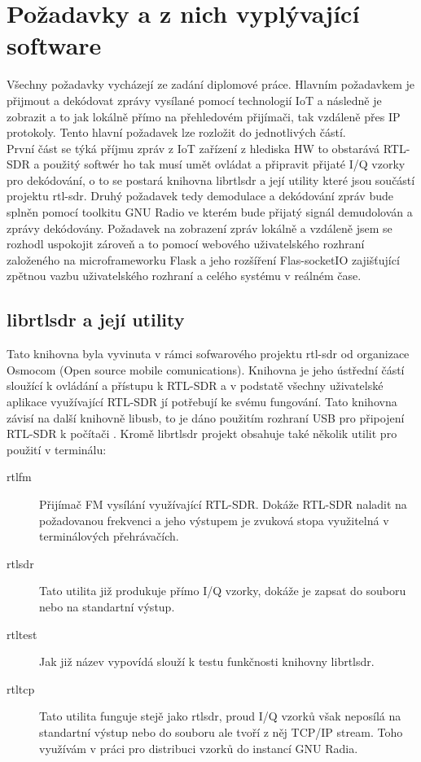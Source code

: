 \documentclass{ctuthesis}
\begin{document}
\section{Požadavky a z nich vyplývající software}
Všechny požadavky vycházejí ze zadání diplomové práce. Hlavním požadavkem je přijmout a dekódovat zprávy vysílané pomocí technologií IoT a následně je zobrazit a to jak lokálně přímo na přehledovém přijímači, tak vzdáleně přes IP protokoly. Tento hlavní požadavek lze rozložit do jednotlivých částí.\\ 
První část se týká příjmu zpráv z IoT zařízení z hlediska HW to obstarává RTL-SDR a použitý softwér ho tak musí umět ovládat a připravit přijaté I/Q vzorky pro dekódování, o to se postará knihovna librtlsdr a její utility které jsou součástí projektu rtl-sdr. Druhý požadavek tedy demodulace a dekódování zpráv bude splněn pomocí toolkitu GNU Radio ve kterém bude přijatý signál demudolován a zprávy dekódovány.  Požadavek na zobrazení zpráv lokálně a vzdáleně jsem se rozhodl uspokojit zároveň a to pomocí webového uživatelského rozhraní založeného na microframeworku Flask a jeho rozšíření Flas-socketIO zajišťující zpětnou vazbu uživatelského rozhraní a celého systému v reálném čase.\\

\subsection{librtlsdr a její utility}
Tato knihovna byla vyvinuta v rámci sofwarového projektu rtl-sdr od organizace Osmocom (Open source mobile comunications). Knihovna je jeho ústřední částí sloužící k ovládání a přístupu k RTL-SDR a v podstatě všechny uživatelské aplikace využívající RTL-SDR jí potřebují ke svému fungování. Tato knihovna závisí na další knihovně libusb, to je dáno použitím rozhraní USB pro připojení RTL-SDR k počítači \cite{osmocom}. Kromě librtlsdr projekt obsahuje také několik utilit pro použití v terminálu:
\begin{description}
\item[rtl\textunderscore fm]
Přijímač FM vysílání využívající RTL-SDR. Dokáže RTL-SDR naladit na požadovanou frekvenci a jeho výstupem je zvuková stopa využitelná v terminálových přehrávačích.
\item[rtl\textunderscore sdr]
Tato utilita již produkuje přímo I/Q vzorky, dokáže je zapsat do souboru nebo na standartní výstup.
\item[rtl\textunderscore test]
Jak již název vypovídá slouží k testu funkčnosti knihovny librtlsdr.
\item[rtl\textunderscore tcp]
Tato utilita funguje stejě jako rtl\textunderscore sdr, proud I/Q vzorků však neposílá na standartní výstup nebo do souboru ale tvoří z něj TCP/IP stream. Toho využívám v práci pro distribuci vzorků do instancí GNU Radia.
\end{description}
\end{document}
